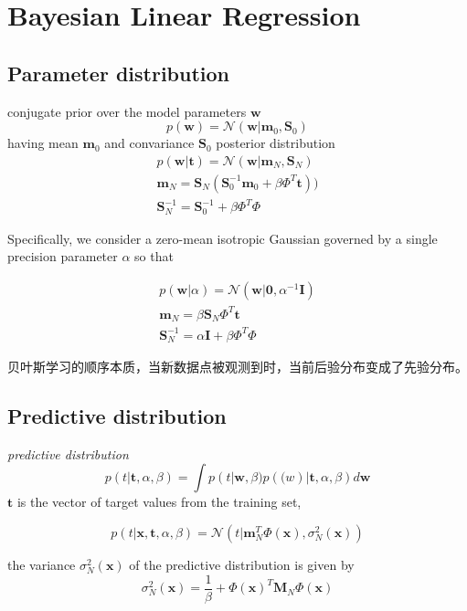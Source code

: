 \documentclass[a4paper]{article}
\begin{document}
\section{Bayesian Linear Regression}
\label{sec:3.3}


\subsection{Parameter distribution}
conjugate prior over the model parameters $ \mathbf{w} $
\[
p(\mathbf{w}) = \mathcal{N}(\mathbf{w} | \mathbf{m}_0, \mathbf{S}_0)
\]
having mean $ \mathbf{m}_0 $ and convariance $ \mathbf{S}_0 $
posterior distribution
\begin{align}
p(\mathbf{w}|\mathbf{t}) = \mathcal{N}(\mathbf{w} | \mathbf{m}_N, \mathbf{S}_N)
\\
\mathbf{m}_N = \mathbf{S}_N(\mathbf{S}_0^{-1} \mathbf{m}_0 + \beta \Phi^T \mathbf{t}))
\\
\mathbf{S}_N^{-1} = \mathbf{S}_0^{-1} + \beta \Phi^T \Phi
\end{align}

Specifically, we consider a zero-mean isotropic Gaussian governed by a single precision parameter $\alpha$ so that

\begin{align}
p(\mathbf{w}|\alpha) = \mathcal{N}(\mathbf{w} | \mathbf{0},
  \alpha^{-1} \mathit{\mathbf{I}})
\\
\mathbf{m}_N = \beta \mathbf{S}_N \Phi^T \mathbf{t}
\\
\mathbf{S}_N^{-1} =  \alpha \mathit{\mathbf{I}} + \beta \Phi^T \Phi
\end{align}

贝叶斯学习的顺序本质，当新数据点被观测到时，当前后验分布变成了先验分布。

\subsection{Predictive distribution}

\textit{predictive distribution}
\[
p(t | \mathbf{t}, \alpha, \beta) = \int p(t | \mathbf{w},
\beta)p(\mathbf(w)|\mathbf{t}, \alpha, \beta) d\mathbf{w}
\]
$ \mathbf{t} $ is the vector of target values from the training set,

\[
p(t | \mathbf{x}, \mathbf{t}, \alpha, \beta) = \mathcal{N}(t |
\mathbf{m}_N^T\Phi(\mathbf{x}),\sigma_N^2(\mathbf{x}))
\]

the variance $ \sigma_N^2(\mathbf{x}) $ of the predictive distribution is given by
\[
\sigma_N^2(\mathbf{x}) = \frac{1}{\beta} + \Phi(\mathbf{x})^T\mathbf{M}_N\Phi(\mathbf{x})
\]
\end{document}
